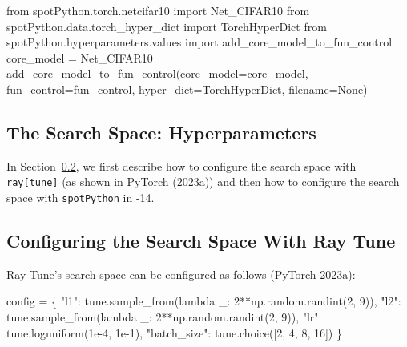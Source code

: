\documentclass[
  letterpaper,
  DIV=11,
  numbers=noendperiod]{scrreprt}
\newenvironment{Shaded}{\begin{snugshade}}{\end{snugshade}}
\newcommand{\ImportTok}[1]{\textcolor[rgb]{0.00,0.46,0.62}{#1}}
\newcommand{\NormalTok}[1]{\textcolor[rgb]{0.00,0.23,0.31}{#1}}
\newcommand{\OperatorTok}[1]{\textcolor[rgb]{0.37,0.37,0.37}{#1}}
\newcommand{\VariableTok}[1]{\textcolor[rgb]{0.07,0.07,0.07}{#1}}
\begin{document}
\begin{Shaded}
\begin{Highlighting}[]
\ImportTok{from}\NormalTok{ spotPython.torch.netcifar10 }\ImportTok{import}\NormalTok{ Net\_CIFAR10}
\ImportTok{from}\NormalTok{ spotPython.data.torch\_hyper\_dict }\ImportTok{import}\NormalTok{ TorchHyperDict}
\ImportTok{from}\NormalTok{ spotPython.hyperparameters.values }\ImportTok{import}\NormalTok{ add\_core\_model\_to\_fun\_control}
\NormalTok{core\_model }\OperatorTok{=}\NormalTok{ Net\_CIFAR10}
\NormalTok{add\_core\_model\_to\_fun\_control(core\_model}\OperatorTok{=}\NormalTok{core\_model,}
\NormalTok{                              fun\_control}\OperatorTok{=}\NormalTok{fun\_control,}
\NormalTok{                              hyper\_dict}\OperatorTok{=}\NormalTok{TorchHyperDict,}
\NormalTok{                              filename}\OperatorTok{=}\VariableTok{None}\NormalTok{)}
\end{Highlighting}
\end{Shaded}

\hypertarget{sec-search-space-14}{%
\subsection{The Search Space:
Hyperparameters}\label{sec-search-space-14}}

In Section~\ref{sec-configuring-the-search-space-with-ray-tune}, we
first describe how to configure the search space with
\texttt{ray{[}tune{]}} (as shown in PyTorch (2023a)) and then how to
configure the search space with \texttt{spotPython} in -14.

\hypertarget{sec-configuring-the-search-space-with-ray-tune}{%
\subsection{Configuring the Search Space With Ray
Tune}\label{sec-configuring-the-search-space-with-ray-tune}}

Ray Tune's search space can be configured as follows (PyTorch 2023a):

\begin{Shaded}
\begin{Highlighting}[]
\NormalTok{config = \{}
\NormalTok{    "l1": tune.sample\_from(lambda \_: 2**np.random.randint(2, 9)),}
\NormalTok{    "l2": tune.sample\_from(lambda \_: 2**np.random.randint(2, 9)),}
\NormalTok{    "lr": tune.loguniform(1e{-}4, 1e{-}1),}
\NormalTok{    "batch\_size": tune.choice([2, 4, 8, 16])}
\NormalTok{\}}
\end{Highlighting}
\end{Shaded}
\end{document}
